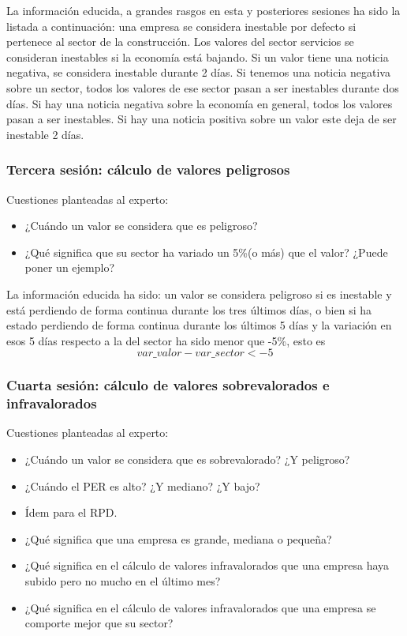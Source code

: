 \documentclass[a4paper,11pt]{article}
\begin{document}
La información educida, a grandes rasgos en esta y posteriores sesiones ha sido la listada a continuación: 
una empresa se considera inestable por defecto si pertenece al sector de la construcción. Los valores del sector servicios
se consideran inestables si la economía está bajando. Si un valor tiene una noticia negativa, se considera inestable durante 2 días.
Si tenemos una noticia negativa sobre un sector, todos los valores de ese sector pasan a ser inestables durante dos días.
Si hay una noticia negativa sobre la economía en general, todos los valores pasan a ser inestables.
Si hay una noticia positiva sobre un valor este deja de ser inestable 2 días.


\subsubsection{Tercera sesión: cálculo de valores peligrosos}

Cuestiones planteadas al experto:
\begin{itemize}
 \item ¿Cuándo un valor se considera que es peligroso?
 \item ¿Qué significa que su sector ha variado un 5\%(o más) que el valor? ¿Puede poner un ejemplo?
\end{itemize}

La información educida ha sido: un valor se considera peligroso si es inestable y está perdiendo de forma continua durante
los tres últimos días, o bien si ha estado perdiendo de forma continua durante los últimos 5 días y la variación en esos 5
días respecto a la del sector ha sido menor que -5\%, esto es $$var\_valor - var\_sector < - 5 $$

\subsubsection{Cuarta sesión: cálculo de valores sobrevalorados e infravalorados}

Cuestiones planteadas al experto:
\begin{itemize}
 \item ¿Cuándo un valor se considera que es sobrevalorado? ¿Y peligroso?
 \item ¿Cuándo el PER es alto? ¿Y mediano? ¿Y bajo?
 \item Ídem para el RPD.
 \item ¿Qué significa que una empresa es grande, mediana o pequeña?
 \item ¿Qué significa en el cálculo de valores infravalorados que una empresa haya subido pero no mucho en el último mes?
 \item ¿Qué significa en el cálculo de valores infravalorados que una empresa se comporte mejor que su sector?
\end{itemize} 
\end{document}
